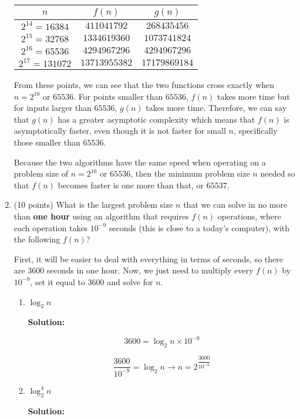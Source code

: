 \documentclass[11pt]{article}
\begin{document}
\begin{enumerate}
\begin{center}
\begin{tabular}{ |c|c|c| } 
\hline
$n$ & $f(n)$ & $g(n)$ \\
\hline
$2^{14} = 16384$  & $411041792$   & $268435456$   \\
$2^{15} = 32768$  & $1334619360$  & $1073741824$  \\
$2^{16} = 65536$  & $4294967296$  & $4294967296$  \\
$2^{17} = 131072$ & $13713955382$ & $17179869184$ \\
\hline
\end{tabular}
\end{center}

From these points, we can see that the two functions cross exactly when $n = 2^{16}$ or $65536$.  For points smaller than $65536$, $f(n)$ takes more time but for inputs larger than $65536$, $g(n)$ takes more time.  Therefore, we can say that $g(n)$ has a greater asymptotic complexity which means that $f(n)$ is asymptotically faster, even though it is not faster for small $n$, specifically those smaller than $65536$.  

Because the two algorithms have the same speed when operating on a problem size of $n = 2^{16}$ or $65536$, then the minimum problem size $n$ needed so that $f(n)$ becomes faster is one more than that, or $65537$.  

\item (10 points) 
What is the largest problem size $n$ that we can solve in no more than 
{\bf  one hour} using an algorithm that requires $f(n)$ operations, 
where each operation takes $10^{-9}$ seconds (this is close to a today's computer), 
with the following $f(n)$?

First, it will be easier to deal with everything in terms of seconds, so there are $3600$ seconds in one hour.  Now, we just need to multiply every $f(n)$ by $10^{-9}$, set it equal to $3600$ and solve for $n$.  

\begin{enumerate}
\item $\log_2 n$

\textbf{Solution: }

$$3600 = \log_2 n \times 10^{-9}$$

$$\frac{3600}{10^{-9}} = \log_2 n \longrightarrow n = 2^{\dfrac{3600}{10^{-9}}}$$

\item $\log^4_2 n$

\textbf{Solution: }


\end{enumerate}
\end{enumerate}
\end{document}
